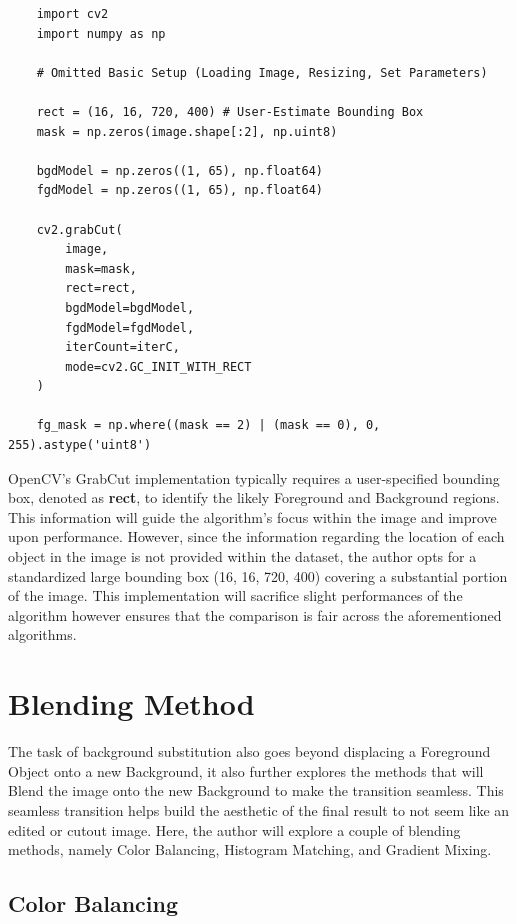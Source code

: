\documentclass{article}
\begin{document}
\begin{verbatim}
    import cv2
    import numpy as np

    # Omitted Basic Setup (Loading Image, Resizing, Set Parameters)

    rect = (16, 16, 720, 400) # User-Estimate Bounding Box
    mask = np.zeros(image.shape[:2], np.uint8)

    bgdModel = np.zeros((1, 65), np.float64)
    fgdModel = np.zeros((1, 65), np.float64)

    cv2.grabCut(
        image,
        mask=mask,
        rect=rect,
        bgdModel=bgdModel,
        fgdModel=fgdModel,
        iterCount=iterC,
        mode=cv2.GC_INIT_WITH_RECT
    )

    fg_mask = np.where((mask == 2) | (mask == 0), 0, 255).astype('uint8')
\end{verbatim}

OpenCV's GrabCut implementation typically requires a user-specified bounding box, denoted as \textbf{rect}, to identify the likely Foreground and Background regions. This information will guide the algorithm's focus within the image and improve upon performance. However, since the information regarding the location of each object in the image is not provided within the dataset, the author opts for a standardized large bounding box (16, 16, 720, 400) covering a substantial portion of the image. This implementation will sacrifice slight performances of the algorithm however ensures that the comparison is fair across the aforementioned algorithms.

\section{Blending Method}

The task of background substitution also goes beyond displacing a Foreground Object onto a new Background, it also further explores the methods that will Blend the image onto the new Background to make the transition seamless. This seamless transition helps build the aesthetic of the final result to not seem like an edited or cutout image. Here, the author will explore a couple of blending methods, namely Color Balancing, Histogram Matching, and Gradient Mixing.

\subsection{Color Balancing}
\end{document}
